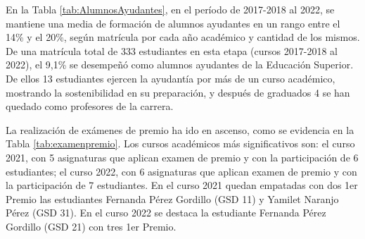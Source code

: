 En la Tabla \ref{tab:AlumnosAyudantes}, en el período de 2017-2018 al 2022, se mantiene una media de formación de alumnos ayudantes en un rango entre el 14\% y el 20\%, según matrícula por cada año académico y cantidad de los mismos. De una matrícula total de 333 estudiantes en esta etapa (cursos 2017-2018 al 2022), el 9,1\% se desempeñó como alumnos ayudantes de la Educación Superior. De ellos 13 estudiantes ejercen la ayudantía por más de un curso académico, mostrando la sostenibilidad en su preparación, y después de graduados 4 se han quedado como profesores de la carrera. 

La realización de exámenes de premio ha ido en ascenso, como se evidencia en la Tabla \ref{tab:examenpremio}. Los cursos académicos más significativos son: el curso 2021, con 5 asignaturas que aplican examen de premio y con la participación de 6 estudiantes; el curso 2022, con 6 asignaturas que aplican examen de premio y con la participación de 7 estudiantes. En el curso 2021 quedan empatadas con dos 1er Premio las estudiantes Fernanda Pérez Gordillo (GSD 11) y Yamilet Naranjo Pérez (GSD 31). En el curso 2022 se destaca la estudiante Fernanda Pérez Gordillo (GSD 21) con tres 1er Premio.

